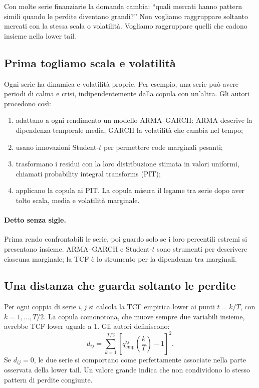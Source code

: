 \documentclass[11pt,a4paper]{article}
\begin{document}
Con molte serie finanziarie la domanda cambia: ``quali mercati hanno pattern
simili quando le perdite diventano grandi?'' Non vogliamo raggruppare soltanto
mercati con la stessa scala o volatilità. Vogliamo raggruppare quelli che
cadono insieme nella lower tail.

\subsection{Prima togliamo scala e volatilità}
Ogni serie ha dinamica e volatilità proprie. Per esempio, una serie può avere
periodi di calma e crisi, indipendentemente dalla copula con un'altra. Gli
autori procedono così:
\begin{enumerate}[leftmargin=*]
  \item adattano a ogni rendimento un modello ARMA--GARCH: ARMA descrive la
  dipendenza temporale media, GARCH la volatilità che cambia nel tempo;
  \item usano innovazioni Student-$t$ per permettere code marginali pesanti;
  \item trasformano i residui con la loro distribuzione stimata in valori
  uniformi, chiamati probability integral transforms (PIT);
  \item applicano la copula ai PIT. La copula misura il legame tra serie dopo
  aver tolto scala, media e volatilità marginale.
\end{enumerate}

\paragraph{Detto senza sigle.} Prima rendo confrontabili le serie, poi guardo
solo se i loro percentili estremi si presentano insieme. ARMA--GARCH e Student-$t$
sono strumenti per descrivere ciascuna marginale; la TCF è lo strumento per la
dipendenza tra marginali.

\subsection{Una distanza che guarda soltanto le perdite}
Per ogni coppia di serie $i,j$ si calcola la TCF empirica lower ai punti
$t=k/T$, con $k=1,\ldots,T/2$. La copula comonotona, che muove sempre due
variabili insieme, avrebbe TCF lower uguale a $1$. Gli autori definiscono:
\begin{equation}
 d_{ij}=\sum_{k=1}^{T/2}
 \left[q_{\mathrm{emp}}^{ij}\!\left(\frac{k}{T}\right)-1\right]^2.
 \label{eq:cluster-distance}
\end{equation}
Se $d_{ij}=0$, le due serie si comportano come perfettamente associate nella
parte osservata della lower tail. Un valore grande indica che non condividono
lo stesso pattern di perdite congiunte.
\end{document}
